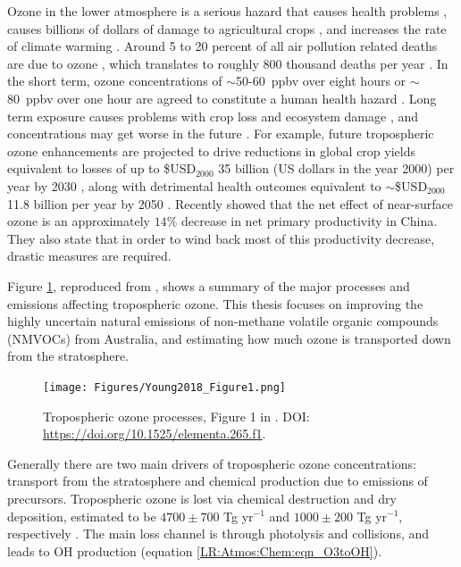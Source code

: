     Ozone in the lower atmosphere is a serious hazard that causes health problems \parencite{Hsieh2013}, causes billions of dollars of damage to agricultural crops \parencite{Avnery2011, Yue2017}, and increases the rate of climate warming \parencite{IPCC_2013_chap8}.
    Around 5 to 20 percent of all air pollution related deaths are due to ozone \parencite{Monks2015}, which translates to roughly 800 thousand deaths per year \parencite{Lelieveld2013}.
    In the short term, ozone concentrations of $\sim$50-60~ppbv over eight hours or $\sim$80~ppbv over one hour are agreed to constitute a human health hazard \parencite{Ayers2006, Lelieveld2009}. 
    Long term exposure causes problems with crop loss and ecosystem damage \parencite{Emberson2003}, and concentrations may get worse in the future \parencite{Lelieveld2009, Stevenson2013}.
    For example, future tropospheric ozone enhancements are projected to drive 
    reductions in global crop yields equivalent to losses of up to 
    \$USD$_{2000}$ 35 billion (US dollars in the year 2000) per year by 2030 
    \parencite{Avnery2011}, along with detrimental health outcomes equivalent 
    to $\sim$\$USD$_{2000}$11.8 billion per year by 2050 \parencite{Selin2009}.
    Recently \textcite{Yue2017} showed that the net effect of near-surface ozone is an approximately $14\%$ decrease in net primary productivity in China.
    They also state that in order to wind back most of this productivity decrease, drastic measures are required. %
    
    Figure \ref{LR:O3:fig_YoungOzoneSummary}, reproduced from \textcite{Young2018}, shows a summary of the major processes and emissions affecting tropospheric ozone.
    This thesis focuses on improving the highly uncertain natural emissions of 
    non-methane volatile organic compounds (NMVOCs) from Australia, and 
    estimating how much ozone is transported down from the stratosphere.
    
    \begin{figure}
      \texttt{[image: Figures/Young2018\_Figure1.png]}
      \caption{%
        Tropospheric ozone processes, Figure 1 in \textcite{Young2018}.
        DOI: \url{https://doi.org/10.1525/elementa.265.f1}.
      }
      \label{LR:O3:fig_YoungOzoneSummary}
    \end{figure}
  
    Generally there are two main drivers of tropospheric ozone concentrations: 
    transport from the stratosphere and chemical production due to emissions of 
    precursors. 
    Tropospheric ozone is lost via chemical destruction and dry deposition, 
    estimated to be $4700\pm700$ Tg yr$^{-1}$ and $1000\pm200$ Tg yr$^{-1}$, 
    respectively \parencite{Stevenson2006, Young2018}.
    The main loss channel is through photolysis and collisions, and leads to OH 
    production (equation \ref{LR:Atmos:Chem:eqn_O3toOH}).
  
